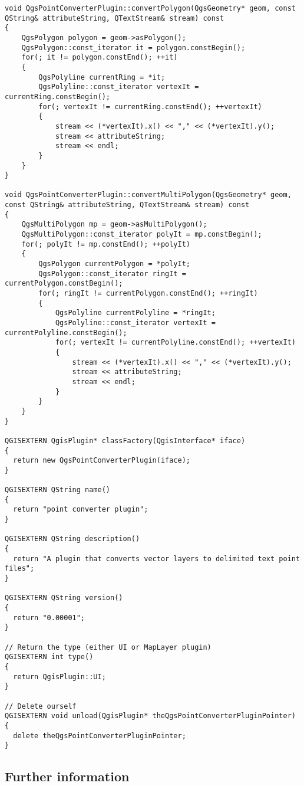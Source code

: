 \begin{verbatim}
void QgsPointConverterPlugin::convertPolygon(QgsGeometry* geom, const QString& attributeString, QTextStream& stream) const
{
    QgsPolygon polygon = geom->asPolygon();
    QgsPolygon::const_iterator it = polygon.constBegin();
    for(; it != polygon.constEnd(); ++it)
    {
        QgsPolyline currentRing = *it;
        QgsPolyline::const_iterator vertexIt = currentRing.constBegin();
        for(; vertexIt != currentRing.constEnd(); ++vertexIt)
        {
            stream << (*vertexIt).x() << "," << (*vertexIt).y();
            stream << attributeString;
            stream << endl;
        }
    }
}

void QgsPointConverterPlugin::convertMultiPolygon(QgsGeometry* geom, const QString& attributeString, QTextStream& stream) const
{
    QgsMultiPolygon mp = geom->asMultiPolygon();
    QgsMultiPolygon::const_iterator polyIt = mp.constBegin();
    for(; polyIt != mp.constEnd(); ++polyIt)
    {
        QgsPolygon currentPolygon = *polyIt;
        QgsPolygon::const_iterator ringIt = currentPolygon.constBegin();
        for(; ringIt != currentPolygon.constEnd(); ++ringIt)
        {
            QgsPolyline currentPolyline = *ringIt;
            QgsPolyline::const_iterator vertexIt = currentPolyline.constBegin();
            for(; vertexIt != currentPolyline.constEnd(); ++vertexIt)
            {
                stream << (*vertexIt).x() << "," << (*vertexIt).y();
                stream << attributeString;
                stream << endl;
            }
        }
    }
}

QGISEXTERN QgisPlugin* classFactory(QgisInterface* iface)
{
  return new QgsPointConverterPlugin(iface);
}

QGISEXTERN QString name()
{
  return "point converter plugin";
}

QGISEXTERN QString description()
{
  return "A plugin that converts vector layers to delimited text point files";
}

QGISEXTERN QString version()
{
  return "0.00001";
}

// Return the type (either UI or MapLayer plugin)
QGISEXTERN int type()
{
  return QgisPlugin::UI;
}

// Delete ourself
QGISEXTERN void unload(QgisPlugin* theQgsPointConverterPluginPointer)
{
  delete theQgsPointConverterPluginPointer;
}

\end{verbatim}

\subsection{Further information}

